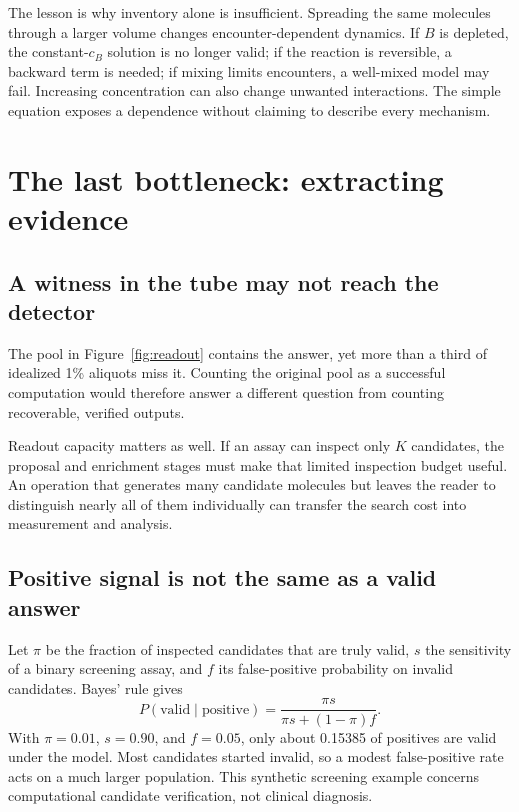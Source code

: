 The lesson is why inventory alone is insufficient. Spreading the same molecules through a larger volume changes encounter-dependent dynamics. If $B$ is depleted, the constant-$c_B$ solution is no longer valid; if the reaction is reversible, a backward term is needed; if mixing limits encounters, a well-mixed model may fail. Increasing concentration can also change unwanted interactions. The simple equation exposes a dependence without claiming to describe every mechanism.

\section{The last bottleneck: extracting evidence}

\subsection{A witness in the tube may not reach the detector}


The pool in Figure~\ref{fig:readout} contains the answer, yet more than a third of idealized 1\% aliquots miss it. Counting the original pool as a successful computation would therefore answer a different question from counting recoverable, verified outputs.

Readout capacity matters as well. If an assay can inspect only $K$ candidates, the proposal and enrichment stages must make that limited inspection budget useful. An operation that generates many candidate molecules but leaves the reader to distinguish nearly all of them individually can transfer the search cost into measurement and analysis.

\subsection{Positive signal is not the same as a valid answer}

Let $\pi$ be the fraction of inspected candidates that are truly valid, $s$ the sensitivity of a binary screening assay, and $f$ its false-positive probability on invalid candidates. Bayes' rule gives
\begin{equation}
P(\mathrm{valid}\mid\mathrm{positive})=
\frac{\pi s}{\pi s+(1-\pi)f}. \label{eq:ppv}
\end{equation}
With $\pi=0.01$, $s=0.90$, and $f=0.05$, only about 0.15385 of positives are valid under the model. Most candidates started invalid, so a modest false-positive rate acts on a much larger population. This synthetic screening example concerns computational candidate verification, not clinical diagnosis.

